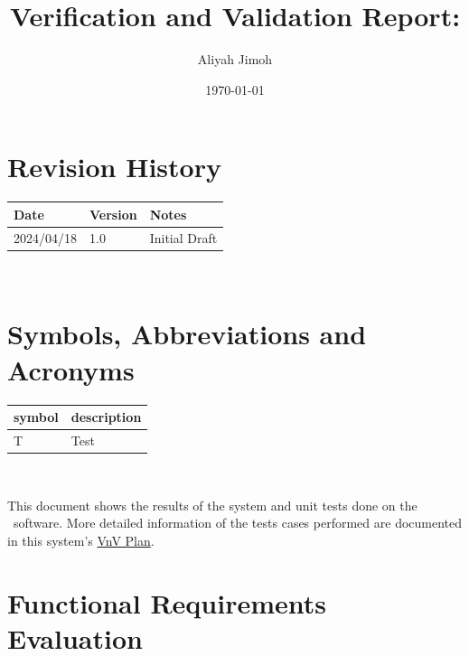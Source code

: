 \documentclass[12pt, titlepage]{article}
\begin{document}
\title{Verification and Validation Report: \progname} 
\author{Aliyah Jimoh}
\date{\today}
	
\maketitle


\section{Revision History}

\begin{tabularx}{\textwidth}{p{3cm}p{2cm}X}
\toprule {\bf Date} & {\bf Version} & {\bf Notes}\\
\midrule
2024/04/18 & 1.0 & Initial Draft\\
\bottomrule
\end{tabularx}

~\newpage

\section{Symbols, Abbreviations and Acronyms}

\renewcommand{\arraystretch}{1.2}
\begin{tabular}{l l} 
  \toprule		
  \textbf{symbol} & \textbf{description}\\
  \midrule 
  T & Test\\
  \bottomrule
\end{tabular}\\


\newpage

\tableofcontents

\listoftables %

\listoffigures %

\newpage


This document shows the results of the system and unit tests done on the \progname~software. More detailed information of the tests cases performed are documented in this system's \href{https://github.com/AliyahJimoh/2D-Localizer/blob/main/docs/VnVPlan/VnVPlan.pdf}{VnV Plan}.

\section{Functional Requirements Evaluation}
\end{document}
